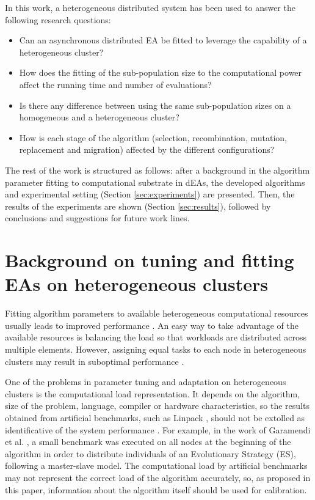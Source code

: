 \documentclass[final,1p,times]{elsarticle}
\begin{document}
In this work, a heterogeneous distributed system has been used to
answer  the following research questions:
\begin{itemize}
 \item Can an asynchronous distributed EA be fitted to leverage the capability of a
   heterogeneous cluster? 
 \item How does the fitting of the sub-population size to the computational power affect the running time and number of evaluations?
 \item Is there any difference between using the same sub-population sizes on a homogeneous and a heterogeneous cluster?
 \item How is each stage of the algorithm (selection, recombination, mutation, replacement and migration) affected by the different
   configurations?
\end{itemize}



The rest of the work is structured as follows: after a background in the algorithm parameter fitting to computational substrate in dEAs, 
 the developed algorithms and experimental setting (Section \ref{sec:experiments}) are presented. 
Then, the results of the experiments are shown (Section \ref{sec:results}), followed by conclusions and suggestions for future work lines.


%
\section{Background on tuning and fitting EAs on heterogeneous clusters}
\label{sec:soa}

Fitting algorithm parameters to available heterogeneous computational resources
usually leads to improved performance
\cite{AutomaticallyConfiguringStyles12}. An easy way to take advantage
of the available resources is  balancing the load
\cite{PARALLELIMPLEMENTATION,Martinez11Nondedicated} so that workloads are distributed across multiple
elements. However, assigning equal tasks  to each node in
heterogeneous clusters may result in suboptimal performance
\cite{LoadBalancingBohn02}. 



One of the problems in parameter tuning and adaptation on heterogeneous clusters is 
the computational load representation. It depends on the algorithm, size of the problem, 
language, compiler or hardware characteristics, so the results obtained from artificial 
benchmarks, such as  Linpack \cite{LinpackEndo10}, should not be extolled as identificative 
of the system performance \cite{LinpackDongarra03}. For example, in the work of Garamendi 
et al. \cite{PARALLELIMPLEMENTATION},  a small benchmark was executed on all nodes at the beginning
of the algorithm in order to distribute individuals of an Evolutionary Strategy
 (ES), following a master-slave model. The computational load by artificial benchmarks may not  
 represent the correct load of the algorithm accurately, so, as proposed in this paper, information 
 about the algorithm itself should be used for calibration.
\end{document}
